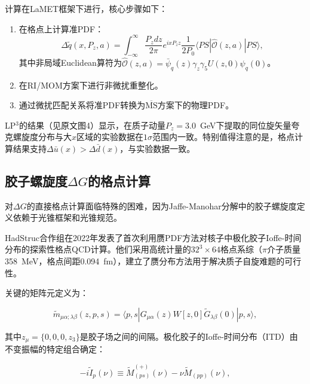 \documentclass[12pt,a4paper]{ctexart}
\theoremstyle{definition}
\begin{document}
计算在LaMET框架下进行，核心步骤如下：

\begin{enumerate}
    \item 在格点上计算准PDF：
    \begin{equation}
    \Delta\tilde{q}(x, P_z, a) = \int_{-\infty}^{\infty} \frac{P_z dz}{2\pi} e^{ixP_z z} \frac{1}{2P_0} \langle PS| \hat{\mathcal{O}}(z,a) |PS\rangle,
    \end{equation}
    其中非局域Euclidean算符为$\hat{\mathcal{O}}(z,a) = \bar{\psi}_q(z)\gamma_z\gamma_5 U(z,0)\psi_q(0)$。

    \item 在RI/MOM方案下进行非微扰重整化。

    \item 通过微扰匹配关系将准PDF转换为$\overline{\text{MS}}$方案下的物理PDF。
\end{enumerate}

LP$^3$的结果（见原文图4）显示，在质子动量$P_z = 3.0$~GeV下提取的同位旋矢量夸克螺旋度分布与大$x$区域的实验数据在$1\sigma$范围内一致。特别值得注意的是，格点计算结果支持$\Delta\bar{u}(x) > \Delta\bar{d}(x)$，与实验数据一致。

\subsection{胶子螺旋度$\Delta G$的格点计算}

对$\Delta G$的直接格点计算面临特殊的困难，因为Jaffe-Manohar分解中的胶子螺旋度定义依赖于光锥框架和光锥规范。

HadStruc合作组在2022年发表了首次利用赝PDF方法对核子中极化胶子Ioffe-时间分布的探索性格点QCD计算\cite{Egerer2022}。他们采用高统计量的$32^3 \times 64$格点系综（$\pi$介子质量358~MeV，格点间距0.094~fm），建立了赝分布方法用于解决质子自旋难题的可行性。

关键的矩阵元定义为：

\begin{equation}
\tilde{m}_{\mu\alpha;\lambda\beta}(z,p,s) = \langle p,s| G_{\mu\alpha}(z) W[z,0] \tilde{G}_{\lambda\beta}(0) |p,s\rangle,
\label{eq:helicity_matrix}
\end{equation}

其中$z_\mu = \{0,0,0,z_3\}$是胶子场之间的间隔。极化胶子的Ioffe-时间分布（ITD）由不变振幅的特定组合确定：

\begin{equation}
-i\tilde{I}_p(\nu) \equiv \tilde{M}_{(ps)}^{(+)}(\nu) - \nu \tilde{M}_{(pp)}(\nu),
\end{equation}
\end{document}
